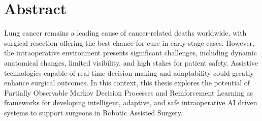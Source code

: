 \chapter*{Abstract}
Lung cancer remains a leading cause of cancer-related deaths worldwide, with surgical
resection offering the best chance for cure in early-stage cases. However, the 
intraoperative environment presents significant challenges, including dynamic 
anatomical changes, limited visibility, and high stakes for patient safety. Assistive 
technologies capable of real-time decision-making and adaptability could greatly 
enhance surgical outcomes. In this context, this thesis explores the potential of 
Partially Observable Markov Decision Processes and Reinforcement Learning 
as frameworks for developing intelligent, adaptive, and safe intraoperative AI driven 
systems to support surgeons in Robotic Assisted Surgery.
